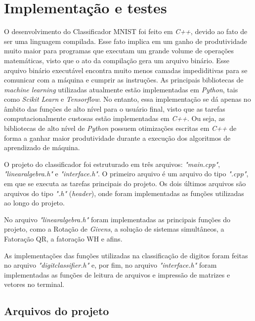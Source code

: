 \documentclass[twocolumn,amsmath,amssymb,floatfix]{revtex4}
\begin{document}
\section{Implementação e testes}

O desenvolvimento do Classificador MNIST foi feito em \textit{C++}, devido ao fato de ser uma linguagem compilada. Esse fato implica em um ganho de produtividade muito maior para programas que executam um grande volume de operações matemáticas, visto que o ato da compilação gera um arquivo binário. Esse arquivo binário executável encontra muito menos camadas impediditivas para se comunicar com a máquina e cumprir as instruções. As principais bibliotecas de \textit{machine learning} utilizadas atualmente estão implementadas em \textit{Python}, tais como \textit{Scikit Learn} e \textit{Tensorflow}. No entanto, essa implementação se dá apenas no âmbito das funções de alto nível para o usuário final, visto que as tarefas computacionalmente custosas estão implementadas em \textit{C++}. Ou seja, as bibliotecas de alto nível de \textit{Python} possuem otimizações escritas em \textit{C++} de forma a ganhar maior produtividade durante a execução dos algoritmos de aprendizado de máquina.

O projeto do classificador foi estruturado em três arquivos: \textit{"main.cpp"}, \textit{"linearalgebra.h"} e \textit{"interface.h"}. O primeiro arquivo é um arquivo do tipo \textit{".cpp"}, em que se executa as tarefas principais do projeto. Os dois últimos arquivos são arquivos do tipo \textit{".h"} (\textit{header}), onde foram implementadas as funções utilizadas ao longo do projeto. 

No arquivo \textit{"linearalgebra.h"} foram implementadas as principais funções do projeto, como a Rotação de \textit{Givens}, a solução de sistemas simultâneos, a Fatoração QR, a fatoração WH e afins.

As implementações das funções utilizadas na classificação de digitos foram feitas no arquivo \textit{"digitclassifier.h"} e, por fim, no arquivo \textit{"interface.h"} foram implementadas as funções de leitura de arquivos e impressão de matrizes e vetores no terminal.

\subsection{Arquivos do projeto}
\end{document}

